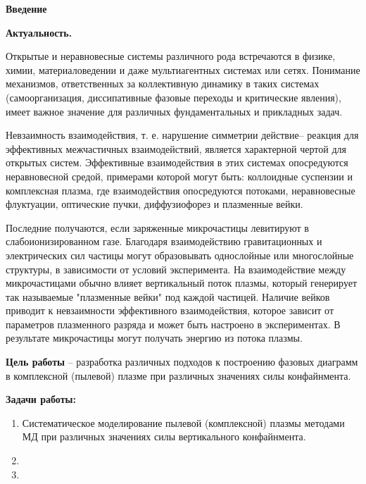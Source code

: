 
\newpage
\begin{center}
\textbf{Введение}
\end{center}



\textbf{Актуальность.}

Открытые и неравновесные системы различного рода встречаются в физике, химии, материаловедении и даже мультиагентных системах или сетях. Понимание механизмов, ответственных за коллективную динамику в таких системах (самоорганизация, диссипативные фазовые переходы и критические явления), имеет важное значение для различных фундаментальных и прикладных задач. 

Невзаимность взаимодействия, т. е. нарушение симметрии действие– реакция для эффективных межчастичных взаимодействий, является характерной чертой для открытых систем. Эффективные взаимодействия в этих системах опосредуются неравновесной средой, примерами которой могут быть: коллоидные суспензии и комплексная плазма, где взаимодействия опосредуются потоками, неравновесные флуктуации, оптические пучки, диффузиофорез и плазменные вейки. 

Последние получаются, если заряженные микрочастицы левитируют в слабоионизированном газе. Благодаря взаимодействию гравитационных и электрических сил частицы могут образовывать однослойные или многослойные структуры, в зависимости от условий эксперимента. На взаимодействие между микрочастицами обычно влияет вертикальный поток плазмы, который генерирует так называемые "плазменные вейки" под каждой частицей. Наличие вейков приводит к невзаимности эффективного взаимодействия, которое зависит от параметров плазменного разряда и может быть настроено в экспериментах. В результате микрочастицы могут  получать энергию из потока плазмы.



\textbf{Цель работы} --
разработка различных подходов к построению фазовых диаграмм в комплексной (пылевой) плазме при различных значениях силы конфайнмента.

\textbf{Задачи работы:}
\begin{enumerate}
\item Систематическое моделирование пылевой (комплексной) плазмы методами МД при различных значениях силы вертикального конфайнмента.
\item
\item
\end{enumerate}


